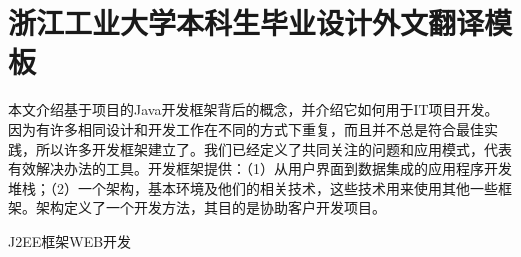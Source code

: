
\chapter*{浙江工业大学本科生毕业设计外文翻译模板}

本文介绍基于项目的Java开发框架背后的概念，并介绍它如何用于IT项目开发。因为有许多相同设计和开发工作在不同的方式下重复，而且并不总是符合最佳实践，所以许多开发框架建立了。我们已经定义了共同关注的问题和应用模式，代表有效解决办法的工具。开发框架提供：（1）从用户界面到数据集成的应用程序开发堆栈；（2）一个架构，基本环境及他们的相关技术，这些技术用来使用其他一些框架。架构定义了一个开发方法，其目的是协助客户开发项目。

J2EE\quad 框架\quad WEB开发
